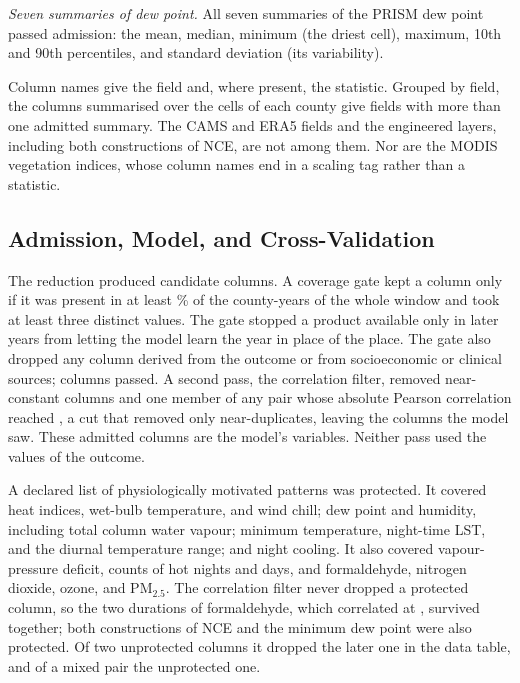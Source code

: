 \documentclass[sensors,article,submit,moreauthors,pdftex]{Definitions/mdpi}
\begin{document}
\textit{Seven summaries of dew point.} All seven summaries of the PRISM dew
point passed admission: the mean, median, minimum (the driest cell),
maximum, 10th and 90th percentiles, and standard deviation (its
variability).

Column names give the field and, where present, the statistic. Grouped by
field, the columns summarised over the cells of each county give
\StatFieldsTotal{} fields with more than one admitted summary. The CAMS and
ERA5 fields and the engineered
layers, including both constructions of NCE, are not among them. Nor are the
MODIS vegetation indices, whose column names end in a scaling tag rather than
a statistic.

\subsection{Admission, Model, and Cross-Validation}
\label{ssec:m_model}
The reduction produced \CatCandidates{} candidate columns. A coverage gate kept
a column only if it was present in at least
\CoverageThreshold{}\% of the county-years of the whole window and took at
least three distinct values. The gate stopped a product available only
in later years from letting the model learn the year in place of the place.
The gate also dropped any column derived from the outcome or from socioeconomic
or clinical sources; \CatAdmitted{} columns passed. A
second pass, the correlation filter, removed near-constant columns and one
member of any pair whose
absolute Pearson correlation reached \CollinearCut{}, a cut that removed only
near-duplicates, leaving the \Nfeatpruned{} columns the model saw. These
admitted columns are the model's variables. Neither pass used the values of the
outcome.

A declared list of physiologically motivated patterns was protected. It covered
heat indices, wet-bulb temperature, and wind chill; dew point and humidity,
including total column water vapour; minimum temperature, night-time LST, and
the diurnal temperature range; and night cooling. It also covered
vapour-pressure deficit, counts of hot nights and days, and formaldehyde,
nitrogen dioxide, ozone, and PM$_{2.5}$. The correlation filter never dropped a
protected column, so the two durations of formaldehyde, which correlated at
\HchoDurCorr{}, survived together; both constructions of NCE and the
minimum dew point were also protected. Of two unprotected columns it dropped the later one in the
data table, and of a mixed pair the unprotected one.
\end{document}
